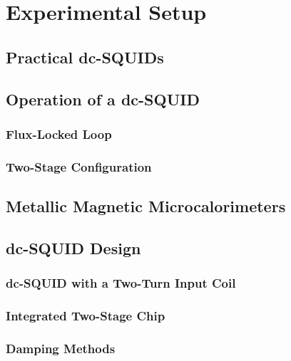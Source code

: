 \chapter{Experimental Setup}

\section{Practical dc-SQUIDs}

\section{Operation of a dc-SQUID}

\subsection{Flux-Locked Loop}

\subsection{Two-Stage Configuration}

\section{Metallic Magnetic Microcalorimeters} 

\section{dc-SQUID Design}

\subsection{dc-SQUID with a Two-Turn Input Coil}

\subsection{Integrated Two-Stage Chip}

\subsection{Damping Methods}